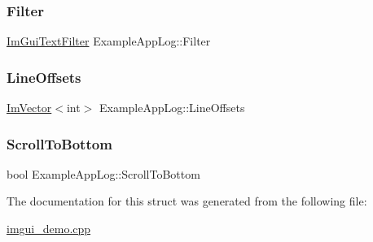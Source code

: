 \subsubsection{\texorpdfstring{Filter}{Filter}}
{\footnotesize\ttfamily \mbox{\hyperlink{struct_im_gui_text_filter}{Im\+Gui\+Text\+Filter}} Example\+App\+Log\+::\+Filter}

\mbox{\label{struct_example_app_log_af197fca7116f9033a5a5e831ee764ee2}} 
\subsubsection{\texorpdfstring{Line\+Offsets}{LineOffsets}}
{\footnotesize\ttfamily \mbox{\hyperlink{class_im_vector}{Im\+Vector}}$<$int$>$ Example\+App\+Log\+::\+Line\+Offsets}

\mbox{\label{struct_example_app_log_a6834b71563c0595e67b78afb6c7ce39d}} 
\subsubsection{\texorpdfstring{Scroll\+To\+Bottom}{ScrollToBottom}}
{\footnotesize\ttfamily bool Example\+App\+Log\+::\+Scroll\+To\+Bottom}



The documentation for this struct was generated from the following file\+:\begin{DoxyCompactItemize}
\item 
\mbox{\hyperlink{imgui__demo_8cpp}{imgui\+\_\+demo.\+cpp}}\end{DoxyCompactItemize}

